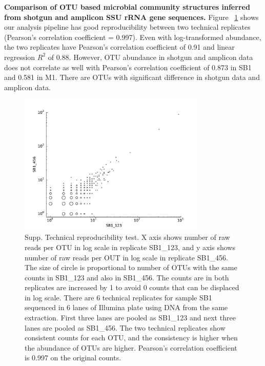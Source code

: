 \documentclass[12pt]{article}
\begin{document}
{\bf Comparison of OTU based microbial community structures inferred
from shotgun and amplicon SSU rRNA gene sequences. } Figure
~\ref{fig:SB1_techrep_OTUscat} shows our analysis pipeline has good
reproducibility between two technical replicates (Pearson’s
correlation coefficient = 0.997). Even with log-transformed abundance,
the two replicates have Pearson’s correlation coefficient of 0.91 and
linear regression $R^2$ of 0.88. However, OTU abundance in shotgun and
amplicon data does not correlate as well with Pearson’s correlation
coefficient of 0.873 in SB1 and 0.581 in M1. There are OTUs with
significant difference in shotgun data and amplicon data.

\begin{figure}[tbph!]
  \centering
  \includegraphics[width=0.8\textwidth]{figs/SB1_techrep_OTUscat}
  \caption[Technical reproducibility test]{Supp. Technical reproducibility test. X axis shows number of raw reads per OTU in log scale in replicate SB1\_123, and y axis shows number of raw reads per OUT in log scale in replicate SB1\_456. The size of circle is proportional to number of OTUs with the same counts in SB1\_123 and also in SB1\_456. The counts are in both replicates are increased by 1 to avoid 0 counts that can be displaced in log scale. There are 6 technical replicates for sample SB1 sequenced in 6 lanes of Illumina plate using DNA from the same extraction. First three lanes are pooled as SB1\_123 and next three lanes are pooled as SB1\_456. The two technical replicates show consistent counts for each OTU, and the consistency is higher when the abundance of OTUs are higher. Pearson’s correlation coefficient is 0.997 on the original counts.}
  \label{fig:SB1_techrep_OTUscat}
\end{figure}
\end{document}
